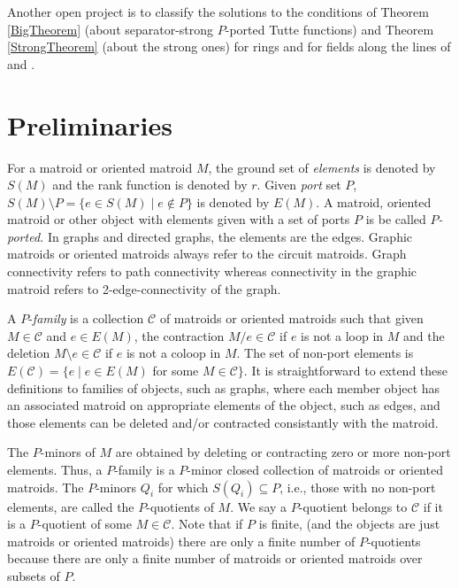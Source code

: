\documentclass[12pt,leqno]{amsart}
\theoremstyle{remark}
\begin{document}
Another open project is to classify the solutions to
the conditions of Theorem \ref{BigTheorem} (about separator-strong
$P$-ported Tutte functions) and 
Theorem  \ref{StrongTheorem} (about the strong ones) for rings and
for fields along the lines of 
\cite{MR93a:05047} and \cite{BollobasRiordanTuttePolyColored}.


\section{Preliminaries}

For a matroid or oriented matroid $M$, the
ground set of \emph{elements} is denoted by $S(M)$ and the rank function 
is denoted by $r$.  Given
\emph{port} set $P$, $S(M)\setminus P=\{e\in S(M) \mid e\not\in P\}$ 
is denoted by $E(M)$.  
A matroid, oriented matroid or other object with elements
given with a set of ports $P$ is be called
\emph{$P$-ported.}  In graphs and directed graphs, the elements 
are the edges.  Graphic matroids or oriented matroids always
refer to the circuit matroids.  Graph connectivity refers to
path connectivity whereas connectivity in the graphic matroid
refers to 2-edge-connectivity of the graph.

A $P$-\emph{family} is a collection $\mathcal{C}$ 
of matroids or oriented matroids such that
given $M\in \mathcal{C}$ and $e\in E(M)$, 
the contraction $M/e\in\mathcal{C}$ if $e$ is not a loop in
$M$ and the deletion $M\setminus e\in\mathcal{C}$ if 
$e$ is  not a coloop in $M$.  
The set of non-port elements 
is $E(\mathcal{C})=\{e\mid e\in E(M)$ for some $M\in\mathcal{C}\}$.
It is straightforward to extend these definitions to families of
objects, such as graphs, where each member object has an associated matroid
on appropriate elements of the object, such as edges, and those elements
can be deleted and/or contracted consistantly with the matroid.


The $P$-minors of $M$ are
obtained
by deleting or contracting zero or more non-port elements.
Thus, a $P$-family is 
a $P$-minor closed collection of matroids or oriented matroids.
The $P$-minors $Q_i$ for which $S(Q_i)\subseteq P$,
i.e., those with no non-port elements, are called the $P$-quotients
of $M$.  We say a $P$-quotient belongs to $\mathcal{C}$ if it is a
$P$-quotient of some $M\in\mathcal{C}$.  Note that if $P$ is finite,
(and the objects are just matroids or oriented matroids)
there are only a finite number of $P$-quotients because there are 
only a finite number of matroids or oriented matroids over subsets
of $P$.
\end{document}
